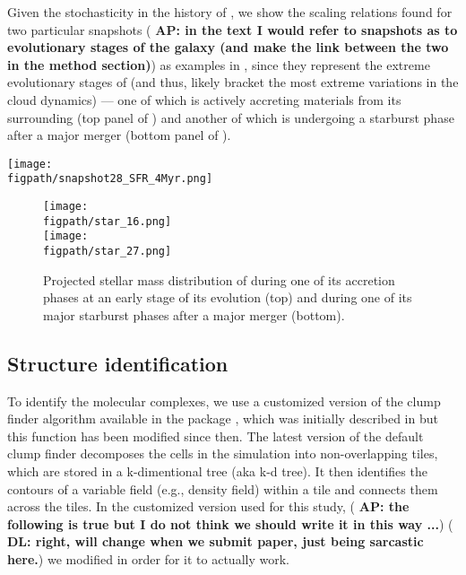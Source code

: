 \documentclass[apj]{emulateapj} %
\newcommand{\AP}[1]{({\bf \color{apcolor} AP: #1})}
\newcommand{\DL}[1]{({\bf \color{dlcolor} DL: #1})}
\begin{document}
Given the stochasticity in the \SF history of \flower,
we show the scaling relations found for two particular snapshots \AP{in the text I would refer to snapshots as to evolutionary stages of the galaxy (and make the link between the two in the method section)} as examples in ,
since they represent the extreme evolutionary stages of \flower (and thus, likely bracket the
most extreme variations in the cloud dynamics) --- one of which \flower is
actively accreting materials from its surrounding (top panel of )
and another of which \flower is undergoing
a starburst phase after a major merger (bottom panel of ).

\begin{figure*}[htbp]
\centering
\texttt{[image: \\figpath/snapshot28\_SFR\_4Myr.png]}
\caption{
	Star formation history of \flower \AP{if possible I would combine it with Fig. \ref{fig:phases} (as in the talk), or remove
	Fig. \ref{fig:phases}, as at the moment it does not add much to the discussion.
	}.
\label{fig:SFH}}
\end{figure*}


\begin{figure}[htbp]
\centering
\texttt{[image: \\figpath/star\_16.png]}
\\ [-5em]
\texttt{[image: \\figpath/star\_27.png]}
\caption{
Projected stellar mass distribution of \flower during one of its accretion phases
at an early stage of its evolution (top) and during one of its major starburst phases
after a major merger (bottom).
\label{fig:phases}}
\end{figure}

\subsection{Structure identification} \label{sec:method}

To identify the molecular complexes, we use a customized version of the clump finder algorithm available in the  package  \citep{Turk2011a}, which was initially described in \citet{Smith09a} but this function has been modified since then.
%
The latest version of the default  clump finder decomposes the cells in the simulation into non-overlapping tiles, which are stored in a k-dimentional tree (aka k-d tree). It then identifies the contours of a variable field (e.g., density field) within a tile and connects them across the tiles. In the customized version used for this study, \AP{the following is true but I do not think we should write it in this way ...} \DL{right, will change when we submit paper, just being sarcastic here.} we modified  in order for it to actually work.
\end{document}
